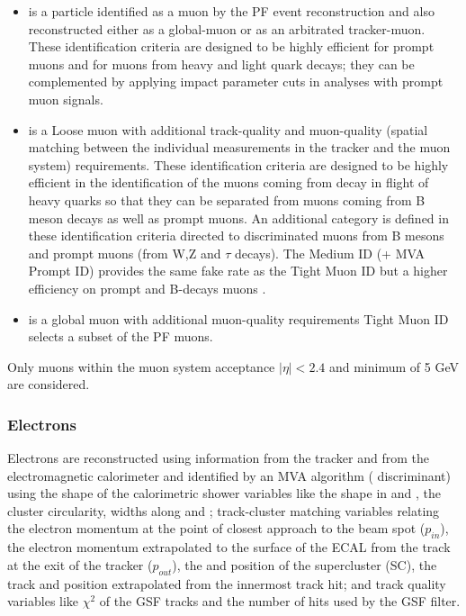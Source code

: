 \begin{itemize}
\item {} is a particle identified as a muon by the PF event reconstruction and also reconstructed either as a global-muon or as an arbitrated tracker-muon. These identification criteria are designed to be highly efficient for prompt muons and for muons from heavy and light quark decays; they can be complemented by applying impact parameter cuts in analyses with prompt muon signals.
\item {} is a Loose muon with additional track-quality and muon-quality (spatial matching between the individual measurements in the tracker and the muon system) requirements. These identification criteria are designed to be highly efficient in the identification of the muons coming from decay in flight of heavy quarks so that they can be separated from muons coming from B meson decays as well as prompt muons. An additional category  is defined in these identification criteria directed to discriminated muons from B mesons and prompt muons (from W,Z and $\tau$ decays). The Medium ID (+ MVA Prompt ID) provides the same fake rate as the Tight Muon ID but a higher efficiency on prompt and B-decays muons \cite{medium_muon}.
\item {} is a global muon with additional muon-quality requirements Tight Muon ID selects a subset of the PF muons.  
\end{itemize}

Only muons within the muon system acceptance $|\eta| < 2.4$ and minimum \pt  of 5 GeV are considered. %

\subsubsection*{Electrons}

Electrons are reconstructed using information from the tracker and from the electromagnetic calorimeter and identified by an MVA algorithm ( discriminant) using the shape of the calorimetric shower variables like the shape in \etac and \phic, the cluster circularity, widths along \etac and \phic; track-cluster matching variables relating the electron momentum at the point of closest approach to the beam spot ($p_{in}$), the electron momentum extrapolated to the surface of the ECAL from the track at the exit of the tracker ($p_{out}$), the \etac and \phic position of the supercluster (SC), the track \etac and \phic position extrapolated from the innermost track hit; and track quality variables like $\chi^2$ of the GSF tracks and the number of hits used by the GSF filter\cite{mva_eid1, mva_eid}.

